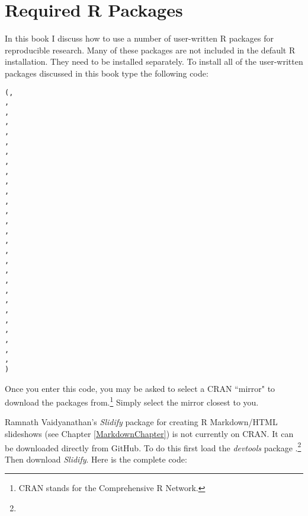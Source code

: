 


\chapter*{Required R Packages} \label{ReqPackages}

In this book I discuss how to use a number of user-written R packages for reproducible research. Many of these packages are not included in the default R installation. They need to be installed separately. To install all of the user-written packages discussed in this book type the following code:

\begin{knitrout}
\color{fgcolor}\begin{kframe}
\begin{alltt}
(,
                , 
                ,
                , 
                ,
                ,
                , 
                ,
                ,
                ,
                , 
                , 
                , 
                ,
                , 
                ,
                ,
                ,
                ,
                ,
                ,
                ,
                ,
                ,
                ,
                ,    
                ,                 
                , 
                )
\end{alltt}
\end{kframe}
\end{knitrout}


\noindent Once you enter this code, you may be asked to select a CRAN ``mirror" to download the packages from.\footnote{CRAN stands for the Comprehensive R Network.} Simply select the mirror closest to you.

 Ramnath Vaidyanathan's \emph{Slidify} package \citeyearpar{R-slidify} for creating R Markdown/HTML slideshows (see Chapter \ref{MarkdownChapter}) is not currently on CRAN. It can be downloaded directly from GitHub. To do this first load the \emph{devtools} package \cite[]{R-devtools}.\footnote{} Then download \emph{Slidify}. Here is the complete code:

